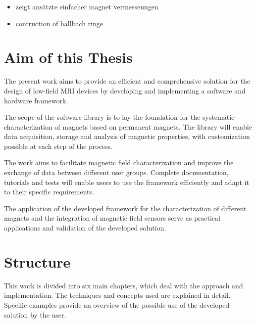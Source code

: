 \begin{itemize}
\item
  zeigt ansätzte einfacher magnet vermesseungen
  \cite{Wickenbrock_2021}
\item
  contruction of hallbach ringe \cite{cmr.a.20165}
\end{itemize}

\hypertarget{aim-of-this-thesis}{%
\section{Aim of this Thesis}\label{aim-of-this-thesis}}

The present work aims to provide an efficient and comprehensive solution
for the design of low-field MRI devices by developing and implementing a
software and hardware framework.

The scope of the software library is to lay the foundation for the
systematic characterization of magnets based on permanent magnets. The
library will enable data acquisition, storage and analysis of magnetic
properties, with customization possible at each step of the process.

The work aims to facilitate magnetic field characterization and improve
the exchange of data between different user groups. Complete
documentation, tutorials and tests will enable users to use the
framework efficiently and adapt it to their specific requirements.

The application of the developed framework for the characterization of
different magnets and the integration of magnetic field sensors serve as
practical applications and validation of the developed solution.

\hypertarget{structure}{%
\section{Structure}\label{structure}}

This work is divided into six main chapters, which deal with the
approach and implementation. The techniques and concepts used are
explained in detail. Specific examples provide an overview of the
possible use of the developed solution by the user.

